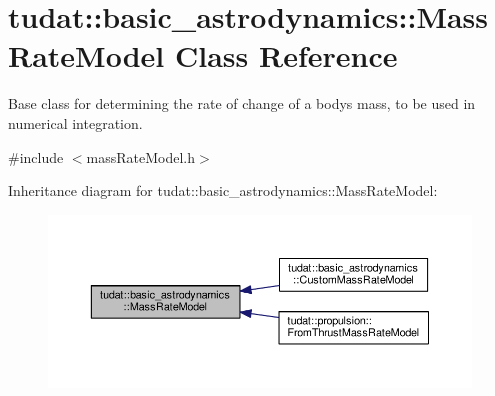 \hypertarget{classtudat_1_1basic__astrodynamics_1_1MassRateModel}{}\section{tudat\+:\+:basic\+\_\+astrodynamics\+:\+:Mass\+Rate\+Model Class Reference}
\label{classtudat_1_1basic__astrodynamics_1_1MassRateModel}


Base class for determining the rate of change of a body\textquotesingle{}s mass, to be used in numerical integration.  




{\ttfamily \#include $<$mass\+Rate\+Model.\+h$>$}



Inheritance diagram for tudat\+:\+:basic\+\_\+astrodynamics\+:\+:Mass\+Rate\+Model\+:
\nopagebreak
\begin{figure}[H]
\begin{center}
\leavevmode
\includegraphics[width=350pt]{classtudat_1_1basic__astrodynamics_1_1MassRateModel__inherit__graph}
\end{center}
\end{figure}
